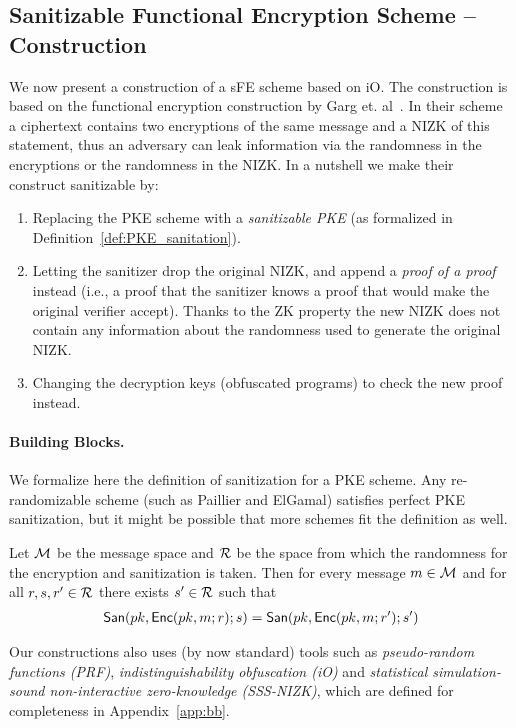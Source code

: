 \documentclass{llncs}
\begin{document}
\subsection{Sanitizable Functional Encryption Scheme -- Construction}\label{sec:sfecons}
We now present a construction of a sFE scheme based on iO. The construction is based on the functional encryption construction by Garg et. al~\cite{DBLP:conf/focs/GargGH0SW13}. In their scheme a ciphertext contains two encryptions of the same message and a NIZK of this statement, thus an adversary can leak information via the randomness in the encryptions or the randomness in the NIZK. In a nutshell we make their construct sanitizable by:
\begin{enumerate}
\item Replacing the PKE scheme with a \emph{sanitizable PKE} (as formalized in Definition~\ref{def:PKE_sanitation}).
\item Letting the sanitizer drop the original NIZK, and append a \emph{proof of a proof} instead (i.e., a proof that the sanitizer knows a proof that would make the original verifier accept). Thanks to the ZK property the new NIZK does not contain any information about the randomness used to generate the original NIZK.
\item Changing the decryption keys (obfuscated programs) to check the new proof instead.

\end{enumerate} 


\paragraph{Building Blocks.} We formalize here the definition of sanitization for a PKE scheme. Any re-randomizable scheme (such as Paillier and ElGamal) satisfies perfect PKE sanitization, but it might be possible that more schemes fit the definition as well.

\begin{defi} \label{def:PKE_sanitation}
Let $\mathcal{M}$ be the message space and $\mathcal{R}$ be the space from which the randomness for the encryption and sanitization is taken. 
Then for every message $m \in \mathcal{M}$ and for all $r,s,r' \in \mathcal{R}$ there exists $s' \in \mathcal{R}$ such that
\begin{align*}
	\mathsf{San}(pk,\mathsf{Enc}(pk,m;r);s) = \mathsf{San}(pk,\mathsf{Enc}(pk,m;r');s')
\end{align*}
\end{defi}

Our constructions also uses (by now standard) tools such as \emph{pseudo-random functions (PRF)}, \emph{indistinguishability obfuscation (iO)} and \emph{statistical simulation-sound non-interactive zero-knowledge (SSS-NIZK)}, which are defined for completeness in Appendix~\ref{app:bb}.
\end{document}
